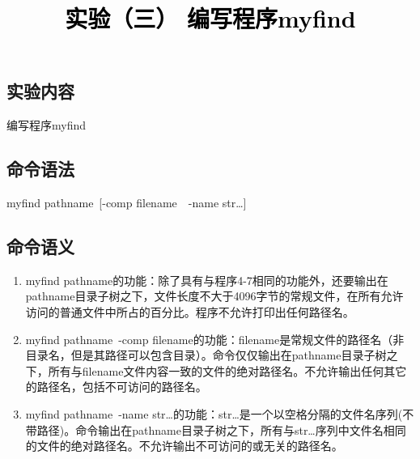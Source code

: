 \documentclass[a4paper,twoside]{article}
\newcommand{\PaperTitle}{实验（三） 编写程序myfind}  %
\begin{document}
\newpage

\title{
	\Large{\textcolor{black}{\PaperTitle}}
}
	
	
\maketitle
	
\tableofcontents
 
\newpage
\setcounter{page}{1}

\begin{spacing}{1.2}

\section{实验内容}

编写程序myfind

\subsection{命令语法}
myfind  \textlangle pathname\textrangle \ [-comp \textlangle filename\textrangle \ \textbar \ -name \textlangle str\textrangle  …]

\subsection{命令语义}

\begin{enumerate}
	\item myfind  \textlangle pathname\textrangle 的功能：除了具有与程序4-7相同的功能外，还要输出在\textlangle pathname\textrangle  目录子树之下，文件长度不大于4096字节的常规文件，在所有允许访问的普通文件中所占的百分比。程序不允许打印出任何路径名。
	\item myfind  \textlangle pathname\textrangle  \  -comp  \textlangle filename\textrangle  的功能：\textlangle filename\textrangle  是常规文件的路径名（非目录名，但是其路径可以包含目录）。命令仅仅输出在\textlangle pathname\textrangle  目录子树之下，所有与\textlangle filename\textrangle  文件内容一致的文件的绝对路径名。不允许输出任何其它的路径名，包括不可访问的路径名。
	\item myfind  \textlangle pathname\textrangle \ -name \textlangle str\textrangle  …的功能：\textlangle str\textrangle  …是一个以空格分隔的文件名序列(不带路径)。命令输出在\textlangle pathname\textrangle  目录子树之下，所有与\textlangle str\textrangle  …序列中文件名相同的文件的绝对路径名。不允许输出不可访问的或无关的路径名。
\end{enumerate}


\end{spacing}
\end{document}
